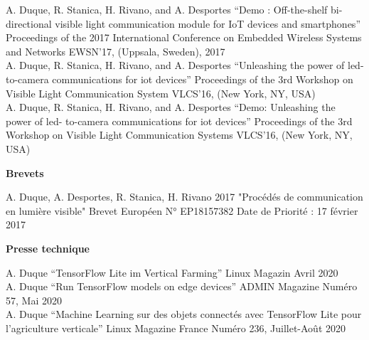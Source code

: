 \documentclass[]{cv-style}          %
\begin{document}
\begin{publist}
\pub
{A. Duque, R. Stanica, H. Rivano, and A. Desportes}
{“Demo : Off-the-shelf bi-directional visible light communication module for IoT devices and smartphones”}
{Proceedings of the 2017 International Conference on Embedded Wireless Systems and Networks}
{EWSN’17, (Uppsala, Sweden), 2017}\\
\pub
  {A. Duque, R. Stanica, H. Rivano, and A. Desportes}
  {“Unleashing the power of led- to-camera communications for iot devices”}
  {Proceedings of the 3rd Workshop on Visible Light Communication System}
  {VLCS’16, (New York, NY, USA)}\\
\pub
  {A. Duque, R. Stanica, H. Rivano, and A. Desportes} {“Demo: Unleashing the power of led- to-camera communications for iot devices”} {Proceedings of the 3rd Workshop on Visible Light Communication Systems} {VLCS’16, (New York, NY, USA)}
\end{publist}


\large{\textbf{Brevets}}

\normalsize
\begin{publist}
\pat
{A. Duque, A. Desportes,  R. Stanica, H. Rivano}
{2017}
{"Procédés de communication en lumière visible"}
{Brevet Européen N° EP18157382}
{Date de Priorité : 17 février 2017}
\\
\end{publist}
\large{\textbf{Presse technique}}

\normalsize
\begin{publist}
\pub
  {A. Duque} {“TensorFlow Lite im Vertical Farming”} {Linux Magazin } {Avril 2020}\\
\pub
  {A. Duque} {“Run TensorFlow models on edge devices”} {ADMIN Magazine} {Numéro 57, Mai 2020}\\
\pub
  {A. Duque} {“Machine Learning sur des objets connectés avec TensorFlow Lite pour l’agriculture verticale”} {Linux Magazine France} {Numéro 236, Juillet-Août 2020}
  
\end{publist}


\end{document}
